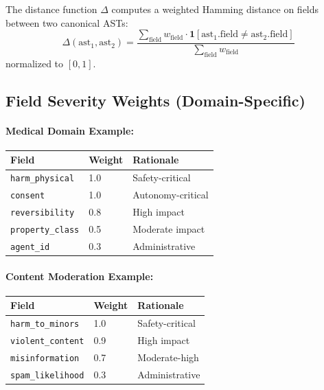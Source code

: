 \documentclass[11pt,letterpaper]{article}
\theoremstyle{definition}
\theoremstyle{remark}
\begin{document}
The distance function $\Delta$ computes a weighted Hamming distance on fields between two canonical ASTs:
\[
\Delta(\text{ast}_1, \text{ast}_2) = \frac{\sum_{\text{field}} w_{\text{field}} \cdot \mathbf{1}[\text{ast}_1.\text{field} \neq \text{ast}_2.\text{field}]}{\sum_{\text{field}} w_{\text{field}}}
\]
normalized to $[0,1]$.

\subsection{Field Severity Weights (Domain-Specific)}

\paragraph{Medical Domain Example:}
\begin{table}[h]
\centering
\begin{tabular}{@{}lll@{}}
\toprule
\textbf{Field} & \textbf{Weight} & \textbf{Rationale} \\
\midrule
\texttt{harm\_physical} & 1.0 & Safety-critical \\
\texttt{consent} & 1.0 & Autonomy-critical \\
\texttt{reversibility} & 0.8 & High impact \\
\texttt{property\_class} & 0.5 & Moderate impact \\
\texttt{agent\_id} & 0.3 & Administrative \\
\bottomrule
\end{tabular}
\end{table}

\paragraph{Content Moderation Example:}
\begin{table}[h]
\centering
\begin{tabular}{@{}lll@{}}
\toprule
\textbf{Field} & \textbf{Weight} & \textbf{Rationale} \\
\midrule
\texttt{harm\_to\_minors} & 1.0 & Safety-critical \\
\texttt{violent\_content} & 0.9 & High impact \\
\texttt{misinformation} & 0.7 & Moderate-high \\
\texttt{spam\_likelihood} & 0.3 & Administrative \\
\bottomrule
\end{tabular}
\end{table}
\end{document}
